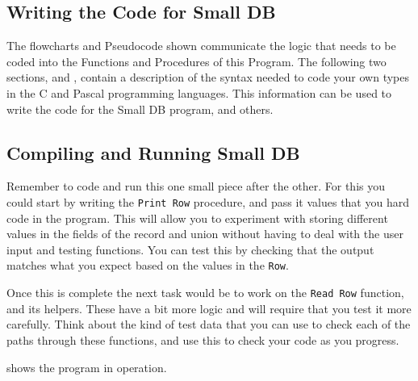 
\subsection{Writing the Code for Small DB} %
\label{sub:writing_the_code_for_small_db}

The flowcharts and Pseudocode shown communicate the logic that needs to be coded into the Functions and Procedures of this Program. The following two sections,   and   , contain a description of the syntax needed to code your own types in the C and Pascal programming languages. This information can be used to write the code for the Small DB program, and others.


\clearpage
\subsection{Compiling and Running Small DB} %
\label{sub:compiling_and_running_small_db}

Remember to code and run this one small piece after the other. For this you could start by writing the \texttt{Print Row} procedure, and pass it values that you hard code in the program. This will allow you to experiment with storing different values in the fields of the record and union without having to deal with the user input and testing functions. You can test this by checking that the output matches what you expect based on the values in the \texttt{Row}.

Once this is complete the next task would be to work on the \texttt{Read Row} function, and its helpers. These have a bit more logic and will require that you test it more carefully. Think about the kind of test data that you can use to check each of the paths through these functions, and use this to check your code as you progress.

 shows the program in operation.


